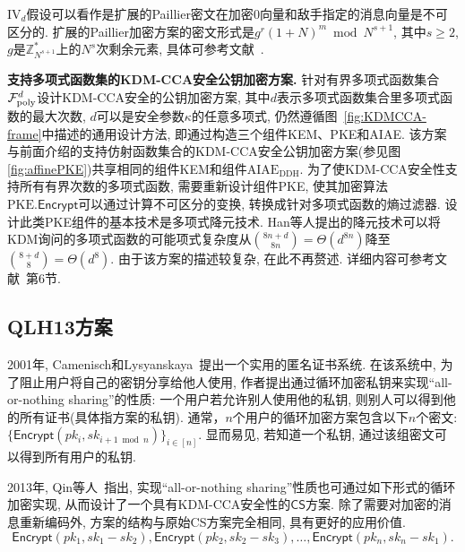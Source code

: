 \begin{note}
IV$_d$假设可以看作是扩展的Paillier密文在加密$0$向量和敌手指定的消息向量是不可区分的. 扩展的Paillier加密方案的密文形式是$g^r(1+N)^m \bmod N^{s+1}$, 其中$s \geq 2$, $g$是$\mathbb{Z}_{N^{s+1}}^*$上的$N^s$次剩余元素, 具体可参考文献~\cite{BG2010}.
\end{note}

\medskip\noindent\textbf{支持多项式函数集的KDM-CCA安全公钥加密方案.} 针对有界多项式函数集合$\mathcal{F}_{\text{poly}}^{d}$设计KDM-CCA安全的公钥加密方案, 其中$d$表示多项式函数集合里多项式函数的最大次数, $d$可以是安全参数$\kappa$的任意多项式, 仍然遵循图~\ref{fig:KDMCCA-frame}中描述的通用设计方法, 即通过构造三个组件KEM、PKE和AIAE. 该方案与前面介绍的支持仿射函数集合的KDM-CCA安全公钥加密方案(参见图\ref{fig:affinePKE})共享相同的组件KEM和组件$\text{AIAE}_{\text{DDH}}$. 为了使KDM-CCA安全性支持所有有界次数的多项式函数, 需要重新设计组件PKE, 使其加密算法$\text{PKE}.\mathsf{Encrypt}$可以通过计算不可区分的变换, 转换成针对多项式函数的熵过滤器. 设计此类PKE组件的基本技术是多项式降元技术. Han等人提出的降元技术可以将KDM询问的多项式函数的可能项式复杂度从$\binom{8n+d}{8n} = \Theta(d^{8n})$降至$\binom{8+d}{8} = \Theta(d^{8})$. 由于该方案的描述较复杂, 在此不再赘述. 详细内容可参考文献~\cite{HLL-ASIACRYPT-2016}第6节.



\subsection{QLH13方案}
2001年, Camenisch和Lysyanskaya~\cite{CL-EUROCRYPT-2001}提出一个实用的匿名证书系统. 在该系统中, 为了阻止用户将自己的密钥分享给他人使用, 作者提出通过循环加密私钥来实现``all-or-nothing sharing''的性质: 一个用户若允许别人使用他的私钥, 则别人可以得到他的所有证书(具体指方案的私钥). 通常，$n$个用户的循环加密方案包含以下$n$个密文: $\{\mathsf{Encrypt}(pk_i,sk_{i+1\bmod n})\}_{i\in[n]}$. 显而易见, 若知道一个私钥, 通过该组密文可以得到所有用户的私钥.

2013年, Qin等人~\cite{Qin-ACISP-2013}指出, 实现``all-or-nothing sharing''性质也可通过如下形式的循环加密实现, 从而设计了一个具有KDM-CCA安全性的$\mathsf{CS}$方案. 除了需要对加密的消息重新编码外, 方案的结构与原始CS方案完全相同, 具有更好的应用价值.
\[
\mathsf{Encrypt}(pk_1, sk_1 - sk_2), \mathsf{Encrypt}(pk_2, sk_2 - sk_3),\ldots,\mathsf{Encrypt}(pk_n, sk_n-sk_1).
\]

